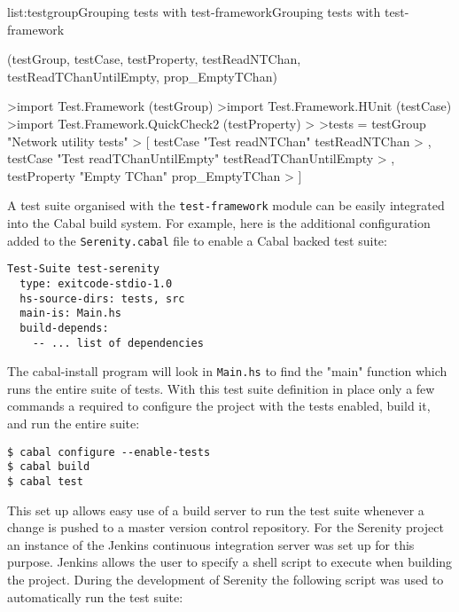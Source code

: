 \vspace{-0.5em}
\begin{listing}{list:testgroup}{Grouping tests with test-framework}{Grouping tests with test-framework}{}
\end{listing}\vspace{-1.5em}

\functions(testGroup, testCase, testProperty, testReadNTChan, testReadTChanUntilEmpty, prop_EmptyTChan)
\begin{haskell}
>import Test.Framework (testGroup)
>import Test.Framework.HUnit (testCase)
>import Test.Framework.QuickCheck2 (testProperty)
>
>tests = testGroup "Network utility tests"
>  [  testCase "Test readNTChan" testReadNTChan
>  ,  testCase "Test readTChanUntilEmpty" testReadTChanUntilEmpty
>  ,  testProperty "Empty TChan" prop_EmptyTChan
>  ]

\end{haskell}
\noindent
A test suite organised with the \texttt{test-framework} module can be easily integrated into the
Cabal build system.
For example, here is the additional configuration added to the \texttt{Serenity.cabal}
file to enable a Cabal backed test suite:

\begin{verbatim}
Test-Suite test-serenity
  type: exitcode-stdio-1.0
  hs-source-dirs: tests, src
  main-is: Main.hs
  build-depends:
    -- ... list of dependencies
\end{verbatim}

\noindent
The cabal-install program will look in \texttt{Main.hs} to find the "main" function
which runs the entire suite of tests.
With this test suite definition in place only a few commands a required to
configure the project with the tests enabled, build it, and run the entire suite:

{
\begin{lstlisting}
$ cabal configure --enable-tests
$ cabal build
$ cabal test
\end{lstlisting}}

\noindent
This set up allows easy use of a build server to run the test suite whenever a change
is pushed to a master version control repository. For the Serenity project an instance
of the Jenkins continuous integration server was set up for this purpose.
Jenkins allows the user to specify a shell script to execute when building the project.
During the development of Serenity the following script was used to automatically run
the test suite:

